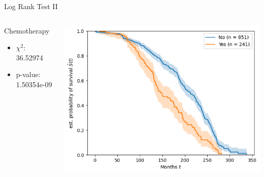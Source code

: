 \documentclass{beamer}
\begin{document}
\begin{frame}{Log Rank Test II}
    \begin{columns}
        \begin{column}{0.49 \textwidth}
        Chemotherapy
        \begin{itemize}
            \item $\chi^2$: 36.52974
            \item p-value: 1.50354e-09
        \end{itemize}
        \end{column}
        \begin{column}{0.49 \textwidth}
            \centering
            \includegraphics[width = \textwidth]{images/logrank2}
        \end{column}
    \end{columns}
\end{frame}
\end{document}
